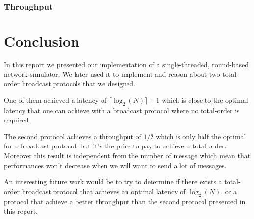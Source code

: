 \documentclass[a4paper]{article}
\begin{document}
\subsubsection*{Throughput}

\section*{Conclusion}
In this report we presented our implementation of a single-threaded,
round-based network simulator. We later used it to implement and reason about
two total-order broadcast protocols that we designed.

One of them achieved a latency of $\lceil\log_2(N)\rceil + 1$ which is close
to the optimal latency that one can achieve with a broadcast protocol where no
total-order is required.

The second protocol achieves a throughput of $1/2$ which is only half the
optimal for a broadcast protocol, but it's the price to pay to achieve a total
order. Moreover this result is independent from the number of message which mean
that performances won't decrease when we will want to send a lot of messages.

An interesting future work would be to try to determine if there exists a
total-order broadcast protocol that achieves an optimal latency of $\log_2(N)$,
or a protocol that achieve a better throughput than the second protocol
presented in this report.
\end{document}
